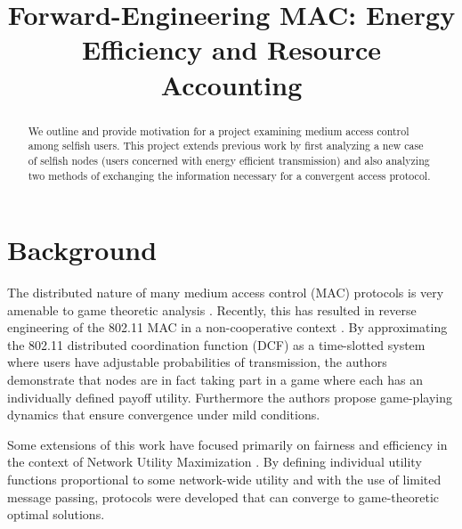 \documentclass[conference]{IEEEtran}
\begin{document}
\title{Forward-Engineering MAC: Energy Efficiency and Resource Accounting}

\author{
}

\maketitle

\begin{abstract}
We outline and provide motivation for a project examining medium access control among selfish users. This project extends previous work by first analyzing a new case of selfish nodes (users concerned with energy efficient transmission) and also analyzing two methods of exchanging the information necessary for a convergent access protocol.
\end{abstract}


\section{Background}
The distributed nature of many medium access control (MAC) protocols is very amenable to game theoretic analysis \cite{LTHCC07,XSR05}. Recently, this has resulted in reverse engineering of the 802.11 MAC in a non-cooperative context \cite{LTHCC07}. By approximating the 802.11 distributed coordination function (DCF) as a time-slotted system where users have adjustable probabilities of transmission, the authors demonstrate that nodes are in fact taking part in a game where each has an individually defined payoff utility. Furthermore the authors propose game-playing dynamics that ensure convergence under mild conditions.

Some extensions of this work have focused primarily on fairness and efficiency in the context of Network Utility Maximization \cite{LCC07}. By defining individual utility functions proportional to some network-wide utility and with the use of limited message passing, protocols were developed that can converge to game-theoretic optimal solutions.
\end{document}
